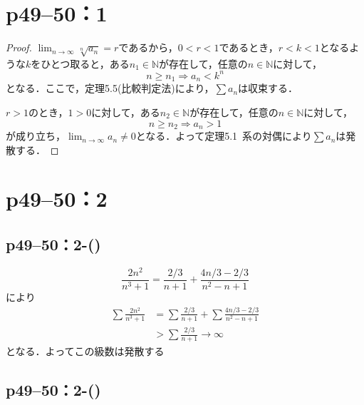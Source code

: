 \section*{p49--50：1}

\begin{tleftbar}
    \begin{proof}
        $\lim_{n \to \infty} \sqrt[n]{a_n} =r$であるから，$0<r<1$であるとき，$r<k<1$となるような$k$をひとつ取ると，ある$n_1 \in \mathbb{N}$が存在して，任意の$n \in \mathbb{N}$に対して，
        \[
            n \ge n_1 \Longrightarrow a_n<k^n
        \]
        となる．ここで，定理5.5(比較判定法)により，$\sum a_n$は収束する．

        $r>1$のとき，$1>0$に対して，ある$n_2 \in \mathbb{N}$が存在して，任意の$n \in \mathbb{N}$に対して，
        \[
            n \ge n_2 \Longrightarrow a_n >1
        \]
        が成り立ち，$\lim_{n \to \infty} a_n \ne 0$となる．よって定理5.1~系の対偶により$\sum a_n$は発散する．
    \end{proof}
\end{tleftbar}


\section*{p49--50：2}


\subsection*{p49--50：2-()}

\begin{screen}
    \[
        \frac{2n^2}{n^3+1}=\frac{2/3}{n+1}+\frac{4n/3-2/3}{n^2-n+1}
    \]
    により
    \begin{align*}
        \sum \frac{2n^2}{n^3+1} & =\sum \frac{2/3}{n+1}+\sum \frac{4n/3-2/3}{n^2-n+1} \\
                                & >\sum \frac{2/3}{n+1} \rightarrow \infty
    \end{align*}
    となる．よってこの級数は発散する
\end{screen}


\subsection*{p49--50：2-()}

